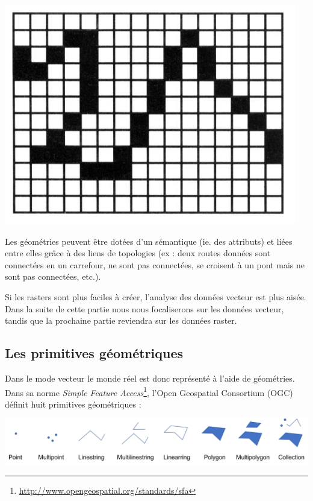 \documentclass[11pt]{article}
\makeatletter
\let\origfigure=\figure
\let\endorigfigure=\endfigure
\renewenvironment{figure}[1][]{%
  \origfigure[H]
}{%
  \endorigfigure
}
\def\maxwidth{\ifdim \Gin@nat@width > 0.8\linewidth 0.8\linewidth \else \Gin@nat@width \fi}
\let\oldincludegraphics\includegraphics
\renewcommand{\includegraphics}[1]{\oldincludegraphics[width=\maxwidth]{#1}}
\makeatother
\begin{document}
\begin{figure}
\centering
\includegraphics{img/cours1/representation_raster.png}
\caption{Représentation raster}
\end{figure}

Les géométries peuvent être dotées d'un sémantique (ie. des attributs)
et liées entre elles grâce à des liens de topologies (ex : deux routes
données sont connectées en un carrefour, ne sont pas connectées, se
croisent à un pont mais ne sont pas connectées, etc.).

Si les rasters sont plus faciles à créer, l'analyse des données vecteur
est plus aisée. Dans la suite de cette partie nous nous focaliserons sur
les données vecteur, tandis que la prochaine partie reviendra sur les
données raster.

\hypertarget{les-primitives-guxe9omuxe9triques}{%
\subsection{Les primitives
géométriques}\label{les-primitives-guxe9omuxe9triques}}

Dans le mode vecteur le monde réel est donc représenté à l'aide de
géométries. Dans sa norme \emph{Simple Feature Access}\footnote{\url{http://www.opengeospatial.org/standards/sfa}},
l'Open Geospatial Consortium (OGC) définit huit primitives géométriques
:

\begin{figure}
\centering
\includegraphics{img/cours1/primitives_geometriques.png}
\caption{Les primitives géométriques}
\end{figure}
\end{document}
